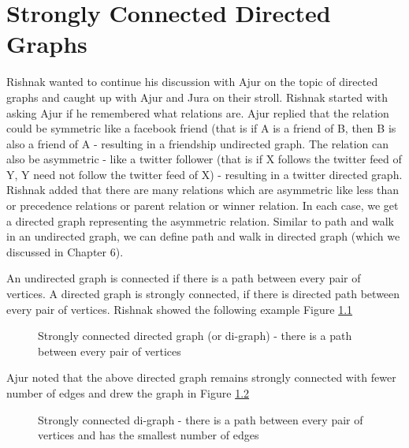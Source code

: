 \chapter{Strongly Connected Directed Graphs}
Rishnak wanted to continue his discussion with Ajur on the topic of directed graphs and caught up with Ajur and Jura on their stroll. Rishnak started with asking Ajur if he remembered what relations are. Ajur replied that the relation could be symmetric like a facebook friend (that is if A is a friend of B, then B is also a friend of A - resulting in a friendship
undirected graph.
The relation can also be asymmetric - like a twitter follower (that is if X follows the twitter
feed of Y, Y need not follow the twitter feed of X) - resulting in a twitter directed graph.
Rishnak added that there are many relations which are asymmetric like less than or precedence relations or parent relation or winner relation. In each case, we get a directed graph representing the asymmetric relation.
Similar to path and walk in an undirected graph, we can define path and walk in directed graph (which we discussed in Chapter 6).

An undirected graph is connected if there is a path between every pair of vertices. A directed graph is strongly connected, if there is directed path between every pair of vertices. Rishnak showed the following example Figure \ref{15g1}

\begin{figure}
\begin{center}
\caption{ Strongly connected directed graph (or di-graph) - there is a path between every pair of vertices}\label{15g1}
\end{center}
\end{figure}

Ajur noted that the above directed graph remains strongly connected with fewer number of edges and  drew the graph in Figure \ref{15g2}

\begin{figure}
\begin{center}
\caption{ Strongly connected di-graph - there is a path between every pair of vertices and has the smallest number of edges}\label{15g2}
\end{center}
\end{figure}

